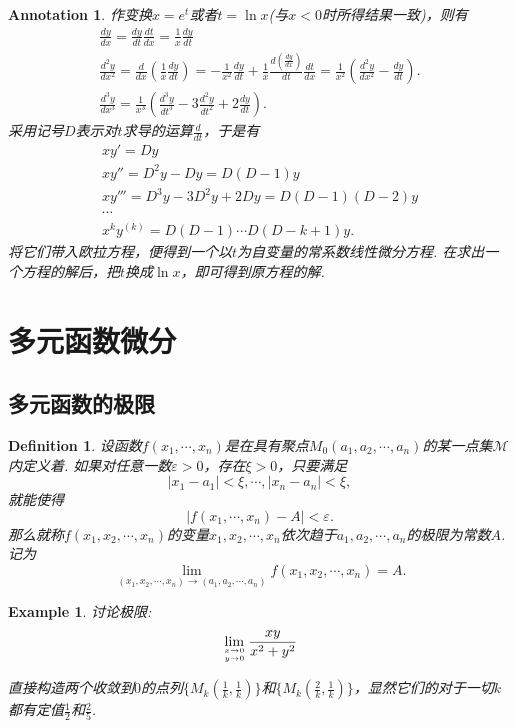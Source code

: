 \documentclass{article}
\newtheorem{example}[theorem]{Example}
\newtheorem{definition}[theorem]{Definition}
\newtheorem{annotation}[theorem]{Annotation}
\begin{document}
\begin{annotation}
\rm 作变换$x=e^t$或者$t = \ln x$(与$x < 0$时所得结果一致)，则有
$$
\begin{array}{ll}
\frac{dy}{dx} = \frac{dy}{dt}\frac{dt}{dx} = \frac{1}{x} \frac{dy}{dt} \\
\frac{d^2y}{dx^2} = \frac{d}{dx}\left(\frac{1}{x}\frac{dy}{dt}\right) =  -\frac{1}{x^2} \frac{dy}{dt} + \frac{1}{x}\frac{d(\frac{dy}{dx})}{dt} \frac{dt}{dx} = \frac{1}{x^2}(\frac{d^2y}{dx^2}-\frac{dy}{dt}). \\
\frac{d^3y}{dx^3} = \frac{1}{x^3}(\frac{d^3y}{dt^3} - 3 \frac{d^2y}{dt^2} + 2\frac{dy}{dt}).
\end{array}
$$
采用记号$D$表示对$t$求导的运算$\frac{d}{dt}$，于是有
$$
\begin{array}{ll}
xy' = Dy \\
xy'' = D^2y - Dy = D(D-1)y \\
xy''' = D^3y - 3D^2y + 2Dy  = D(D-1)(D-2)y \\
\cdots \\
x^ky^{(k)} = D(D-1)\cdots D(D-k+1)y.
\end{array}
$$
将它们带入欧拉方程，便得到一个以$t$为自变量的常系数线性微分方程. 在求出一个方程的解后，把$t$换成$\ln x$，即可得到原方程的解. 
\end{annotation}


\newpage
\section{多元函数微分}

\subsection{多元函数的极限}

\begin{definition}
\rm 设函数$f(x_1,\cdots,x_n)$是在具有聚点$M_0(a_1,a_2,\cdots,a_n)$的某一点集$\mathcal{M}$内定义着. 如果对任意一数$\varepsilon > 0$，存在$\xi > 0$，只要满足
$$
|x_1 - a_1| < \xi,\cdots,|x_n - a_n| < \xi,
$$
就能使得
$$
|f(x_1,\cdots,x_n) - A| < \varepsilon. 
$$
那么就称$f(x_1,x_2,\cdots,x_n)$的变量$x_1,x_2,\cdots,x_n$依次趋于$a_1,a_2,\cdots,a_n$的极限为常数$A$. 记为
$$
\lim\limits_{(x_1,x_2,\cdots,x_n) \to (a_1,a_2,\cdots,a_n)}f(x_1,x_2,\cdots,x_n) = A.
$$
\end{definition}

\begin{example}
\rm 讨论极限:
$$
\lim\limits_{x \rightarrow 0 \atop y \rightarrow 0 } \frac{xy}{x^2+y^2}
$$

直接构造两个收敛到$0$的点列$\{M_k(\frac{1}{k}, \frac{1}{k})\}$和$\{M_k(\frac{2}{k}, \frac{1}{k})\}$，显然它们的对于一切$k$都有定值$\frac{1}{2}$和$\frac{2}{5}$.
\end{example}
\end{document}
